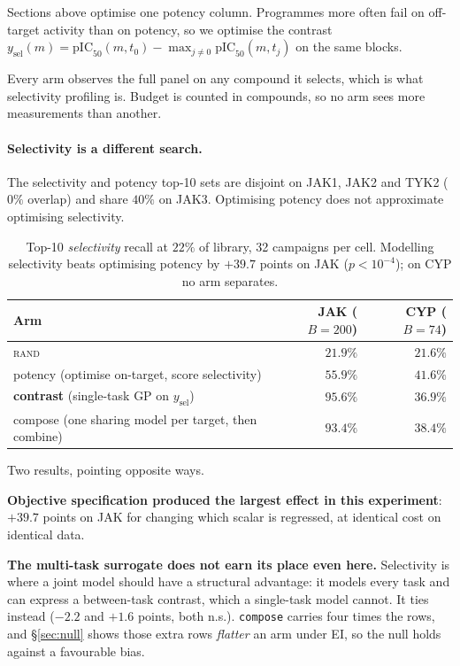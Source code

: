 \documentclass[11pt]{article}
\newcommand{\rnd}{\textsc{rand}}
\begin{document}
\label{sec:selectivity}

Sections above optimise one potency column. Programmes more often fail on
off-target activity than on potency, so we optimise the contrast
$y_{\text{sel}}(m) = \mathrm{pIC}_{50}(m, t_0) - \max_{j \neq 0}
\mathrm{pIC}_{50}(m, t_j)$ on the same blocks.

Every arm observes the full panel on any compound it selects, which is what
selectivity profiling is. Budget is counted in compounds, so no arm sees more
measurements than another.

\paragraph{Selectivity is a different search.} The selectivity and potency
top-10 sets are disjoint on JAK1, JAK2 and TYK2 ($0\%$ overlap) and share $40\%$
on JAK3. Optimising potency does not approximate optimising selectivity.

\begin{table}[ht]
\centering\small
\begin{tabular}{lrr}
\toprule
Arm & JAK ($B = 200$) & CYP ($B = 74$) \\
\midrule
\rnd{}                                   & $21.9\%$ & $21.6\%$ \\
potency (optimise on-target, score selectivity) & $55.9\%$ & $41.6\%$ \\
\textbf{contrast} (single-task GP on $y_{\text{sel}}$) & $\mathbf{95.6\%}$ & $36.9\%$ \\
compose (one sharing model per target, then combine)  & $93.4\%$ & $38.4\%$ \\
\bottomrule
\end{tabular}
\caption{Top-10 \emph{selectivity} recall at $22\%$ of library, 32 campaigns per
cell. Modelling selectivity beats optimising potency by $+39.7$ points on JAK
($p < 10^{-4}$); on CYP no arm separates.}
\label{tab:selectivity}
\end{table}

Two results, pointing opposite ways.

\textbf{Objective specification produced the largest effect in this
experiment}: $+39.7$
points on JAK for changing which scalar is regressed, at identical cost on
identical data.

\textbf{The multi-task surrogate does not earn its place even here.} Selectivity
is where a joint model should have a structural advantage: it models
every task and can express a between-task contrast, which a single-task model
cannot. It ties instead ($-2.2$ and $+1.6$ points, both n.s.). \texttt{compose}
carries four times the rows, and \S\ref{sec:null} shows those extra rows
\emph{flatter} an arm under EI, so the null holds against a favourable bias.
\end{document}
